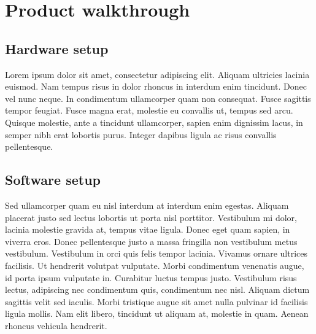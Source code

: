 \chapter{Product walkthrough} %

\label{ch:walkthrough} 


\section{Hardware setup}

Lorem ipsum dolor sit amet, consectetur adipiscing elit. Aliquam ultricies lacinia euismod. Nam tempus risus in dolor rhoncus in interdum enim tincidunt. Donec vel nunc neque. In condimentum ullamcorper quam non consequat. Fusce sagittis tempor feugiat. Fusce magna erat, molestie eu convallis ut, tempus sed arcu. Quisque molestie, ante a tincidunt ullamcorper, sapien enim dignissim lacus, in semper nibh erat lobortis purus. Integer dapibus ligula ac risus convallis pellentesque.


\section{Software setup}

Sed ullamcorper quam eu nisl interdum at interdum enim egestas. Aliquam placerat justo sed lectus lobortis ut porta nisl porttitor. Vestibulum mi dolor, lacinia molestie gravida at, tempus vitae ligula. Donec eget quam sapien, in viverra eros. Donec pellentesque justo a massa fringilla non vestibulum metus vestibulum. Vestibulum in orci quis felis tempor lacinia. Vivamus ornare ultrices facilisis. Ut hendrerit volutpat vulputate. Morbi condimentum venenatis augue, id porta ipsum vulputate in. Curabitur luctus tempus justo. Vestibulum risus lectus, adipiscing nec condimentum quis, condimentum nec nisl. Aliquam dictum sagittis velit sed iaculis. Morbi tristique augue sit amet nulla pulvinar id facilisis ligula mollis. Nam elit libero, tincidunt ut aliquam at, molestie in quam. Aenean rhoncus vehicula hendrerit.